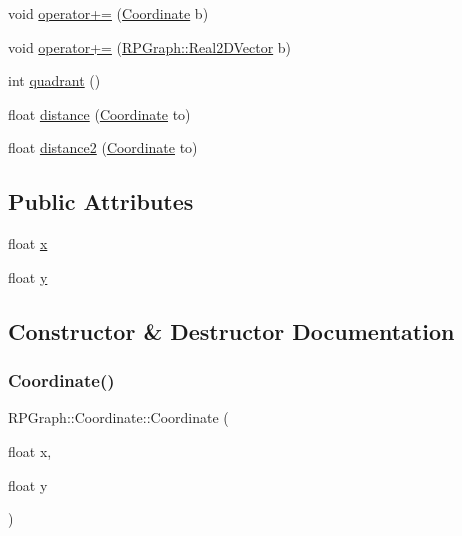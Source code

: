 \begin{DoxyCompactItemize}
void \mbox{\hyperlink{classRPGraph_1_1Coordinate_abac1dc8089bc6eea4b881392ccc20531}{operator+=}} (\mbox{\hyperlink{classRPGraph_1_1Coordinate}{Coordinate}} b)
\item 
void \mbox{\hyperlink{classRPGraph_1_1Coordinate_a24e0a572e28b783e67cc859b8734d19b}{operator+=}} (\mbox{\hyperlink{classRPGraph_1_1Real2DVector}{R\+P\+Graph\+::\+Real2\+D\+Vector}} b)
\item 
int \mbox{\hyperlink{classRPGraph_1_1Coordinate_aa2972edc6b8613790125d3908b40c96d}{quadrant}} ()
\item 
float \mbox{\hyperlink{classRPGraph_1_1Coordinate_a71242c2da98d16e94c2cb7207401fd86}{distance}} (\mbox{\hyperlink{classRPGraph_1_1Coordinate}{Coordinate}} to)
\item 
float \mbox{\hyperlink{classRPGraph_1_1Coordinate_a0204c00b328c156c556605587dfd8d9e}{distance2}} (\mbox{\hyperlink{classRPGraph_1_1Coordinate}{Coordinate}} to)
\end{DoxyCompactItemize}
\subsection*{Public Attributes}
\begin{DoxyCompactItemize}
\item 
float \mbox{\hyperlink{classRPGraph_1_1Coordinate_abbb78e1ac79af2c54785565f995e5d9d}{x}}
\item 
float \mbox{\hyperlink{classRPGraph_1_1Coordinate_a595c47428a7ce4b3172d0372e20c6818}{y}}
\end{DoxyCompactItemize}


\subsection{Constructor \& Destructor Documentation}
\mbox{\label{classRPGraph_1_1Coordinate_a6d1ffc03b2cb43af855f8db7cddf6ad9}} 
\subsubsection{\texorpdfstring{Coordinate()}{Coordinate()}}
{\footnotesize\ttfamily R\+P\+Graph\+::\+Coordinate\+::\+Coordinate (\begin{DoxyParamCaption}\item[{float}]{x,  }\item[{float}]{y }\end{DoxyParamCaption})}

